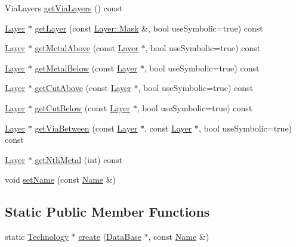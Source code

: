\begin{DoxyCompactItemize}
\item 
Via\-Layers \hyperlink{classHurricane_1_1Technology_aae80bb16820bedc833a63f5d5edcf7a0}{get\-Via\-Layers} () const 
\item 
\hyperlink{classHurricane_1_1Layer}{Layer} $\ast$ \hyperlink{classHurricane_1_1Technology_a8d8dc520746b2b2bd9090db178500949}{get\-Layer} (const \hyperlink{classHurricane_1_1Layer_af5277c670637bd5d910237e7afe01a91}{Layer\-::\-Mask} \&, bool use\-Symbolic=true) const 
\item 
\hyperlink{classHurricane_1_1Layer}{Layer} $\ast$ \hyperlink{classHurricane_1_1Technology_a4e3a56956e2a9e107a1db7d9e245aebf}{get\-Metal\-Above} (const \hyperlink{classHurricane_1_1Layer}{Layer} $\ast$, bool use\-Symbolic=true) const 
\item 
\hyperlink{classHurricane_1_1Layer}{Layer} $\ast$ \hyperlink{classHurricane_1_1Technology_a2c5912a477364316a56d657a437ce8a2}{get\-Metal\-Below} (const \hyperlink{classHurricane_1_1Layer}{Layer} $\ast$, bool use\-Symbolic=true) const 
\item 
\hyperlink{classHurricane_1_1Layer}{Layer} $\ast$ \hyperlink{classHurricane_1_1Technology_af02d8fc51b585ce03c90deec16cf255b}{get\-Cut\-Above} (const \hyperlink{classHurricane_1_1Layer}{Layer} $\ast$, bool use\-Symbolic=true) const 
\item 
\hyperlink{classHurricane_1_1Layer}{Layer} $\ast$ \hyperlink{classHurricane_1_1Technology_a65deee28c0b3b80dde67a6a1c2f8bb8e}{get\-Cut\-Below} (const \hyperlink{classHurricane_1_1Layer}{Layer} $\ast$, bool use\-Symbolic=true) const 
\item 
\hyperlink{classHurricane_1_1Layer}{Layer} $\ast$ \hyperlink{classHurricane_1_1Technology_a2cb9e9c789cb51b6614c832970b60e52}{get\-Via\-Between} (const \hyperlink{classHurricane_1_1Layer}{Layer} $\ast$, const \hyperlink{classHurricane_1_1Layer}{Layer} $\ast$, bool use\-Symbolic=true) const 
\item 
\hyperlink{classHurricane_1_1Layer}{Layer} $\ast$ \hyperlink{classHurricane_1_1Technology_a2a6ce35857e74830723ed18192fe4488}{get\-Nth\-Metal} (int) const 
\item 
void \hyperlink{classHurricane_1_1Technology_a247b75d5cbb85198cea9e5e609304cd0}{set\-Name} (const \hyperlink{classHurricane_1_1Name}{Name} \&)
\end{DoxyCompactItemize}
\subsection*{Static Public Member Functions}
\begin{DoxyCompactItemize}
\item 
static \hyperlink{classHurricane_1_1Technology}{Technology} $\ast$ \hyperlink{classHurricane_1_1Technology_a8fd65387c7fd6ba1396f905fadf20087}{create} (\hyperlink{classHurricane_1_1DataBase}{Data\-Base} $\ast$, const \hyperlink{classHurricane_1_1Name}{Name} \&)
\end{DoxyCompactItemize}


